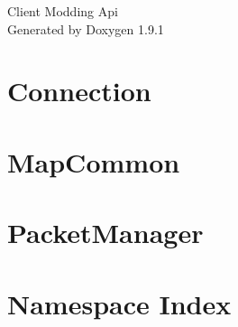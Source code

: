 \let\mypdfximage\pdfximage\def\pdfximage{\immediate\mypdfximage}\documentclass[twoside]{book}
\newcommand{\+}{\discretionary{\mbox{\scriptsize$\hookleftarrow$}}{}{}}
\newcommand{\clearemptydoublepage}{%
  \newpage{\pagestyle{empty}\cleardoublepage}%
}
\begin{document}
\raggedbottom

\hypersetup{pageanchor=false,
             bookmarksnumbered=true,
             pdfencoding=unicode
            }
\begin{titlepage}
\vspace*{7cm}
\begin{center}%
{\Large Client Modding Api }\\
\vspace*{1cm}
{\large Generated by Doxygen 1.9.1}\\
\end{center}
\end{titlepage}
\clearemptydoublepage
{}
\tableofcontents
\clearemptydoublepage
{}
\hypersetup{pageanchor=true}

\chapter{Connection}
\label{md__c__code__ditz__client_modding_a_p_i__client_modding__api__custom_classes__connection__r_e_a_d_m_e}

\chapter{Map\+Common}
\label{md__c__code__ditz__client_modding_a_p_i__client_modding__api__custom_classes__map_common__r_e_a_d_m_e}

\chapter{Packet\+Manager}
\label{md__c__code__ditz__client_modding_a_p_i__client_modding__api__packet_manager__r_e_a_d_m_e}

\chapter{Namespace Index}

\end{document}

